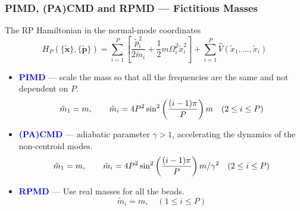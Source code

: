 \begin{frame}
  \frametitle{PIMD, (PA)CMD and RPMD --- Fictitious Masses}
  The RP Hamiltonian in the normal-mode coordinates
  \begin{equation*}
    H_P(\{\mathbf{\tilde{x}}\}, \{\mathbf{\tilde{p}}\}) =
    \sum_{i=1}^P
    \left[
      \frac{\tilde{p}_i^2}{2\tilde{m}_i}
      +
      \frac{1}{2} m \Omega_i^2 \tilde{x}_i^2
    \right]
      +
      \sum_{i=1}^P 
      \hat{V}(\tilde{x}_1,\ldots,\tilde{x}_i)
  \end{equation*}
  \medskip
  \begin{itemize}
  \item \textcolor{blue}{\textbf{PIMD}} --- scale the mass so that all the frequencies are the
    same and not dependent on $P$.
    \begin{equation*}
      \tilde{m}_1 = m, \qquad \tilde{m}_i = 4P^2\sin^2\left({(i-1)\pi\over
          P}\right) m \quad (2 \le i \le P)
    \end{equation*}
  \item \textcolor{blue}{\textbf{(PA)CMD}} --- adiabatic parameter $\gamma > 1$, accelerating the dynamics of the non-centroid modes.
    \begin{equation*}
      \tilde{m}_1 = m, \qquad \tilde{m}_i = 4P^2\sin^2\left({(i-1)\pi\over
          P}\right) m / \gamma^2 \quad (2 \le i \le P)
    \end{equation*}
  \item \textcolor{blue}{\textbf{RPMD}} --- Use real masses for all the beads.
    \begin{equation*}
      \tilde{m}_i = m, \quad (1 \le i \le P)
    \end{equation*}
  \end{itemize}
\end{frame}
